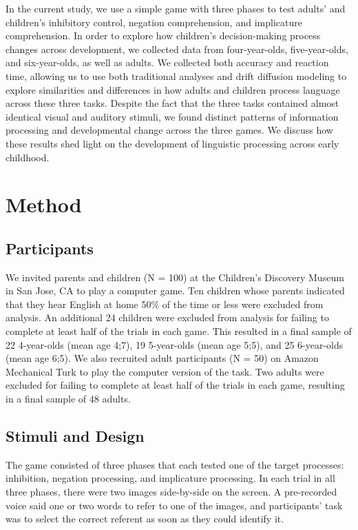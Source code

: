 \documentclass[10pt,letterpaper]{article}
\begin{document}
In the current study, we use a simple game with three phases to test adults' and children's inhibitory control, negation comprehension, and implicature comprehension.  In order to explore how children's decision-making process changes across development, we collected data from four-year-olds, five-year-olds, and six-year-olds, as well as adults.  We collected both accuracy and reaction time, allowing us to use both traditional analyses and drift diffusion modeling to explore similarities and differences in how adults and children process language across these three tasks.  Despite the fact that the three tasks contained almost identical visual and auditory stimuli, we found distinct patterns of information processing and developmental change across the three games.  We discuss how these results shed light on the development of linguistic processing across early childhood.

\section{Method}

\subsection{Participants}

We invited parents and children (N = 100) at the Children's Discovery Museum in San Jose, CA to play a computer game.  Ten children whose parents indicated that they hear English at home 50\% of the time or less were excluded from analysis.  An additional 24 children were excluded from analysis for failing to complete at least half of the trials in each game.  This resulted in a final sample of 22 4-year-olds (mean age 4;7), 19 5-year-olds (mean age 5;5), and 25 6-year-olds (mean age 6;5).  We also recruited adult participants (N = 50) on Amazon Mechanical Turk to play the computer version of the task.  Two adults were excluded for failing to complete at least half of the trials in each game, resulting in a final sample of 48 adults.  

\subsection{Stimuli and Design}

The game consisted of three phases that each tested one of the target processes: inhibition, negation processing, and implicature processing.  In each trial in all three phases, there were two images side-by-side on the screen. A pre-recorded voice said one or two words to refer to one of the images, and participants' task was to select the correct referent as soon as they could identify it.
\end{document}
